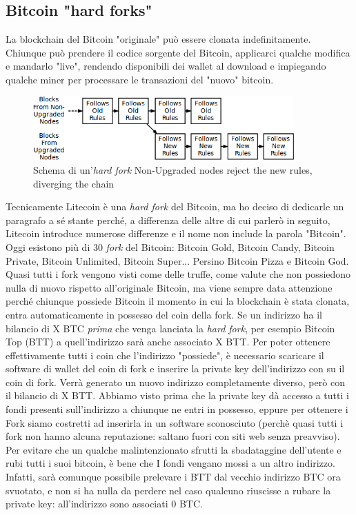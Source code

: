 \documentclass {article}
\begin{document}
\subsection {Bitcoin "hard forks"}


La blockchain del Bitcoin "originale" può essere clonata indefinitamente. Chiunque può prendere il codice sorgente del Bitcoin, applicarci qualche modifica e mandarlo "live", rendendo disponibili dei wallet al download e impiegando qualche miner per processare le transazioni del "nuovo" bitcoin.

\vspace {0.5cm}
\begin{figure}[htb!]
\includegraphics [width = 10cm] {hard_fork.png}
\centering
\caption {Schema di un'\textit{hard fork} Non-Upgraded nodes reject the new rules, diverging the chain}
\end{figure}
\vspace {0.2cm}
\noindent
%
Tecnicamente Litecoin è una \textit{hard fork} del Bitcoin, ma ho deciso di dedicarle un paragrafo a sé stante perché, a differenza delle altre di cui parlerò in seguito, Litecoin introduce numerose differenze e il nome non include la parola "Bitcoin".
Oggi esistono più di 30 \textit{fork} del Bitcoin: Bitcoin Gold, Bitcoin Candy, Bitcoin Private, Bitcoin Unlimited, Bitcoin Super... Persino Bitcoin Pizza e Bitcoin God.
Quasi tutti i fork vengono visti come delle truffe, come valute che non possiedono nulla di nuovo rispetto all'originale Bitcoin, ma viene sempre data attenzione perché chiunque possiede Bitcoin il momento in cui la blockchain è stata clonata, entra automaticamente in possesso del coin della fork.
Se un indirizzo ha il bilancio di X BTC \emph{prima} che venga lanciata la \textit{hard fork}, per esempio Bitcoin Top (BTT) a quell'indirizzo sarà anche associato X BTT.
Per poter ottenere effettivamente tutti i coin che l'indirizzo "possiede", è necessario scaricare il software di wallet del coin di fork e inserire la private key dell'indirizzo con su il coin di fork.
Verrà generato un nuovo indirizzo completamente diverso, però con il bilancio di X BTT.
Abbiamo visto prima che la private key dà accesso a tutti i fondi presenti sull'indirizzo a chiunque ne entri in possesso, eppure per ottenere i Fork siamo costretti ad inserirla in un software sconosciuto (perchè quasi tutti i fork non hanno alcuna reputazione: saltano fuori con siti web senza preavviso).
Per evitare che un qualche malintenzionato sfrutti la sbadataggine dell'utente e rubi tutti i suoi bitcoin, è bene che I fondi vengano mossi a un altro indirizzo.
Infatti, sarà comunque possibile prelevare i BTT dal vecchio indirizzo BTC ora svuotato, e non si ha nulla da perdere nel caso qualcuno riuscisse a rubare la private key: all'indirizzo sono associati 0 BTC.
\end{document}
